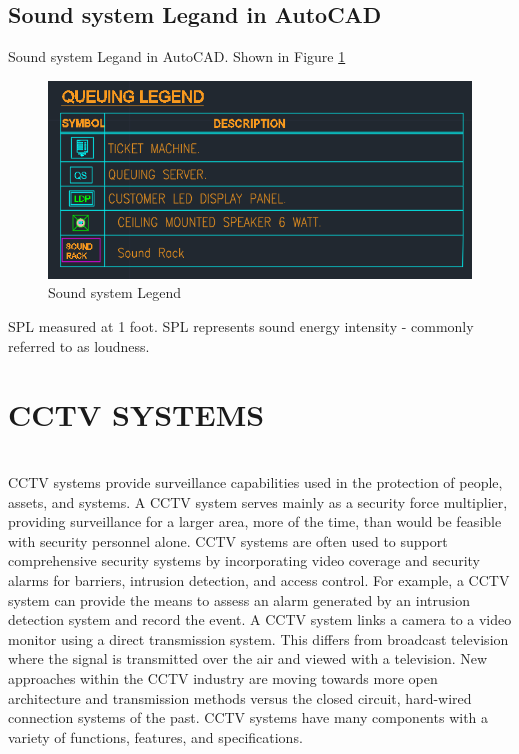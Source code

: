 \documentclass[12pt,fleqn]{book} %
\begin{document}
\subsection{Sound system Legand in AutoCAD }
Sound system Legand in AutoCAD. Shown in Figure \ref{fig:sound new 4}
\begin{figure}[!h]
    \centering
    \includegraphics[width=1\linewidth]{sound new 4.png}
    \caption{Sound system Legend}
    \label{fig:sound new 4}
    \end{figure}
    \begin{note}
    SPL measured at 1 foot. SPL represents sound energy intensity - commonly referred to as loudness.
    \end{note}
\newpage
\section{CCTV SYSTEMS}
\\CCTV systems provide surveillance capabilities used in the protection of people, assets, and systems. A CCTV system serves mainly as a security force multiplier, providing surveillance for a larger area, more of the time, than would be feasible with security personnel alone. CCTV systems are often used to support comprehensive security systems by incorporating video coverage and security alarms for barriers, intrusion detection, and access control. For example, a CCTV system can provide the means to assess an alarm generated by an intrusion detection system and record the event. A CCTV system links a camera to a video monitor using a direct transmission system. This differs from broadcast television where the signal is transmitted over the air and viewed with a television. New approaches within the CCTV industry are moving towards more open architecture and transmission methods versus the closed circuit, hard-wired connection systems of the past. CCTV systems have many components with a variety of functions, features, and specifications. 
\end{document}
